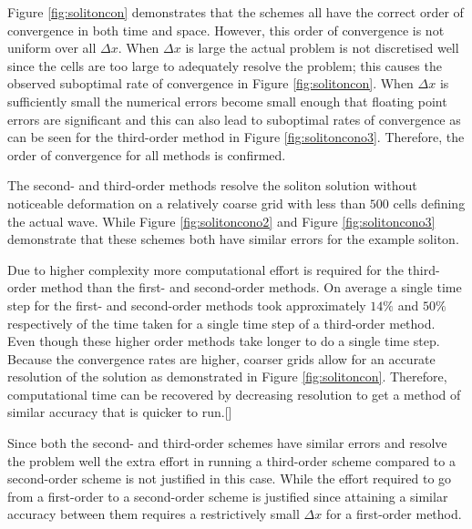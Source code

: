 \documentclass[SingleSpace,12pt]{Serre_ASCE}
\begin{document}
Figure \ref{fig:solitoncon} demonstrates that the schemes all have the correct order of convergence in both time and space. However, this order of convergence is not uniform over all $\Delta x$. When $\Delta x$ is large the actual problem is not discretised well since the cells are too large to adequately resolve the problem; this causes the observed suboptimal rate of convergence in Figure \ref{fig:solitoncon}. When $\Delta x$ is sufficiently small the numerical errors become small enough that floating point errors are significant and this can also lead to suboptimal rates of convergence as can be seen for the third-order method in Figure \ref{fig:solitoncono3}. Therefore, the order of convergence for all methods is confirmed. 

The second- and third-order methods resolve the soliton solution without noticeable deformation on a relatively coarse grid with less than $500$ cells defining the actual wave. While Figure \ref{fig:solitoncono2} and Figure \ref{fig:solitoncono3}  demonstrate that these schemes both have similar errors for the example soliton.

Due to higher complexity more computational effort is required for the third-order method than the first- and second-order methods. On average a single time step for the first- and second-order methods took approximately $14\%$ and $50\%$ respectively of the time taken for a single time step of a third-order method. Even though these higher order methods take longer to do a single time step. Because the convergence rates are higher, coarser grids allow for an accurate resolution of the solution as demonstrated in Figure \ref{fig:solitoncon}. Therefore, computational time can be recovered by decreasing resolution to get a method of similar accuracy that is quicker to run.[]

Since both the second- and third-order schemes have similar errors and resolve the problem well the extra effort in running a third-order scheme compared to a second-order scheme is not justified in this case. While the effort required to go from a first-order to a second-order scheme is justified since attaining a similar accuracy between them requires a restrictively small $\Delta x$ for a first-order method.   

\end{document}
